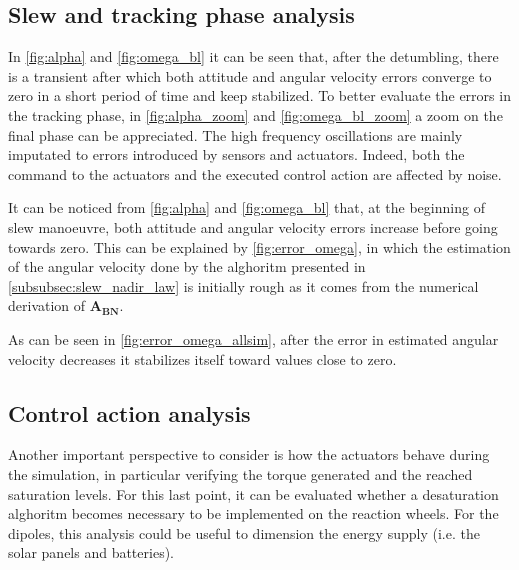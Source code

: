 \subsection{Slew and tracking phase analysis}
\label{subsec:slew_analysis}



In \autoref{fig:alpha} and \autoref{fig:omega_bl} it can be seen that, after the detumbling, there is a transient after which both attitude and angular velocity errors converge to zero in a short period of time and keep stabilized.
To better evaluate the errors in the tracking phase, in \autoref{fig:alpha_zoom} and \autoref{fig:omega_bl_zoom} a zoom on the final phase can be appreciated. The high frequency oscillations are mainly imputated to errors introduced by sensors and actuators. Indeed, both the command to the actuators and the executed control action are affected by noise.

It can be noticed from \autoref{fig:alpha} and \autoref{fig:omega_bl} that, at the beginning of slew manoeuvre, both attitude and angular velocity errors increase before going towards zero. This can be explained by \autoref{fig:error_omega}, in which the estimation of the angular velocity done by the alghoritm presented in \autoref{subsubsec:slew_nadir_law} is initially rough as it comes from the numerical derivation of $\boldsymbol{A_{BN}}$.


As can be seen in \autoref{fig:error_omega_allsim}, after the error in estimated angular velocity decreases it stabilizes itself toward values close to zero.

\subsection{Control action analysis}
\label{subsec:control_analysis}

Another important perspective to consider is how the actuators behave during the simulation, in particular verifying the torque generated and the reached saturation levels. For this last point, it can be evaluated whether a desaturation alghoritm becomes necessary to be implemented on the reaction wheels. For the dipoles, this analysis could be useful to dimension the energy supply (i.e. the solar panels and batteries).

